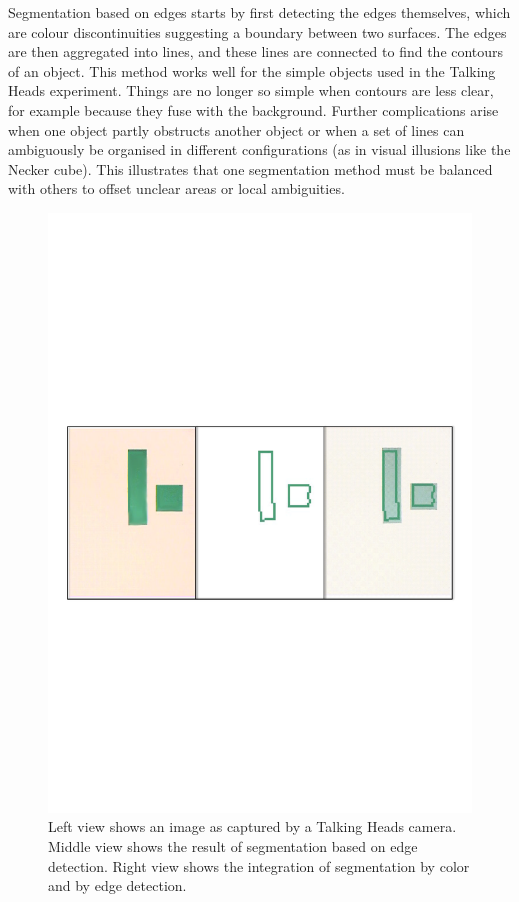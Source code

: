 Segmentation based on edges starts by first detecting the 
edges themselves, which are colour discontinuities suggesting a boundary
between two surfaces. The edges are then aggregated into lines, and these lines are 
connected to find the contours 
of an object. This method works well for the simple 
objects used in the Talking 
Heads experiment. Things are
no longer so simple when contours are less
clear, for example because they fuse with the background. 
Further complications arise when one object partly obstructs
another object or when a set of lines can ambiguously 
be organised in different configurations (as in visual illusions
like the Necker cube). This illustrates that one 
segmentation method must be balanced with others to offset unclear 
areas or local ambiguities. 

\begin{figure}[htbp]
  \centerline{\includegraphics[width=.75\textwidth]{chap3/figs/image1}}
\caption{ Left view shows an image as captured by a Talking
Heads camera. Middle view shows the result of 
segmentation based on edge detection. Right view
shows the integration of segmentation by color
and by edge detection.}
\label{f:plate11}
\end{figure}

